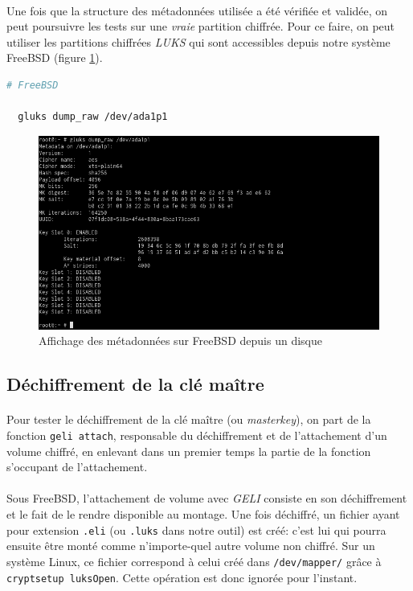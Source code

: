 \paragraph{}
Une fois que la structure des métadonnées utilisée a été vérifiée et validée, on
peut poursuivre les tests sur une \textit{vraie} partition chiffrée. Pour ce
faire, on peut utiliser les partitions chiffrées \textit{LUKS} qui sont
accessibles depuis notre système FreeBSD (figure \ref{fig:freebsd_dump_disk}).
\\
\begin{lstlisting}[language=bash]
  # FreeBSD

  gluks dump_raw /dev/ada1p1
\end{lstlisting}
\begin{figure}[H]
  \centering
  \includegraphics[width=\linewidth]{tests/freebsd_dump_disk.png}
  \caption{\label{fig:freebsd_dump_disk}Affichage des métadonnées sur FreeBSD
    depuis un disque}
\end{figure}

\subsection{Déchiffrement de la clé maître}
\paragraph{}
Pour tester le déchiffrement de la clé maître (ou \textit{masterkey}), on part
de la fonction \texttt{geli attach}, responsable du déchiffrement et de
l'attachement d'un volume chiffré, en enlevant dans un premier temps la partie
de la fonction s'occupant de l'attachement.
\paragraph{}
Sous FreeBSD, l'attachement de volume avec \textit{GELI} consiste en son
déchiffrement et le fait de le rendre disponible au montage. Une fois déchiffré,
un fichier ayant pour extension \texttt{.eli} (ou \texttt{.luks} dans notre
outil) est créé: c'est lui qui pourra ensuite être monté comme n'importe-quel
autre volume non chiffré. Sur un système Linux, ce fichier correspond à celui
créé dans \texttt{/dev/mapper/} grâce à \texttt{cryptsetup luksOpen}. Cette
opération est donc ignorée pour l'instant.
